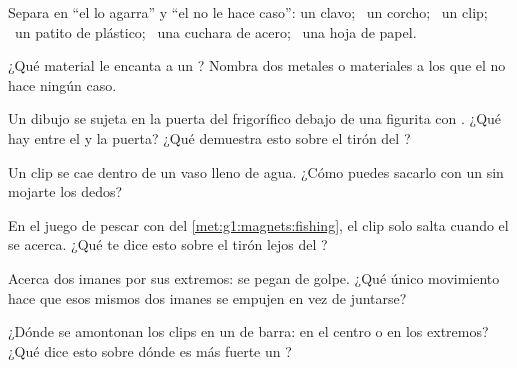 \begin{exercise}[$\star$]\label{exo:g1:magnets:1}
Separa en ``el  lo agarra'' y ``el  no le hace caso'': un
clavo; \ un corcho; \ un clip; \ un patito de plástico; \ una cuchara
de acero; \ una hoja de papel.
\end{exercise}

\begin{exercise}[$\star$]\label{exo:g1:magnets:2}
¿Qué material le encanta a un ? Nombra dos metales o materiales
a los que el  no hace ningún caso.
\end{exercise}

\begin{exercise}[$\star$]\label{exo:g1:magnets:3}
Un dibujo se sujeta en la puerta del frigorífico debajo de una
figurita con . ¿Qué hay entre el  y la puerta? ¿Qué
demuestra esto sobre el tirón del ?
\end{exercise}

\begin{exercise}[$\star$]\label{exo:g1:magnets:4}
Un clip se cae dentro de un vaso lleno de agua. ¿Cómo puedes sacarlo
con un  sin mojarte los dedos?
\end{exercise}

\begin{exercise}[$\star$]\label{exo:g1:magnets:5}
En el juego de pescar con  del \cref{met:g1:magnets:fishing}, el
clip solo salta cuando el  se acerca. ¿Qué te dice esto sobre el
tirón lejos del ?
\end{exercise}

\begin{exercise}[$\star$]\label{exo:g1:magnets:6}
Acerca dos imanes por sus extremos: se pegan de golpe. ¿Qué único
movimiento hace que esos mismos dos imanes se empujen en vez de
juntarse?
\end{exercise}

\begin{exercise}[$\star$]\label{exo:g1:magnets:7}
¿Dónde se amontonan los clips en un  de barra: en el centro o en
los extremos? ¿Qué dice esto sobre dónde es más fuerte un ?
\end{exercise}

